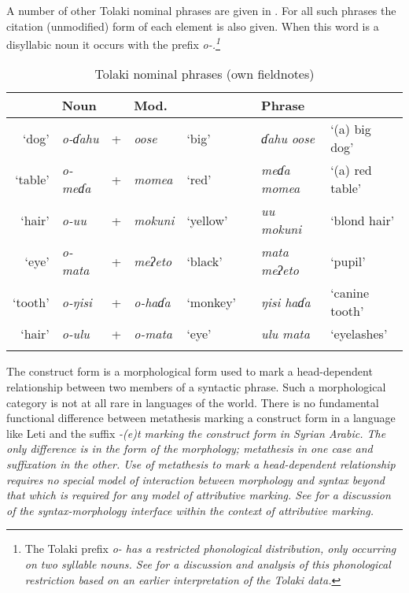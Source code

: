 \begin{exe}\let\eachwordone=\textit
\end{exe}

A number of other Tolaki nominal phrases are given in .
For all such phrases the citation (unmodified) form of each element is also given.
When this word is a disyllabic noun it occurs with the prefix \it{o-}.\footnote{
		The Tolaki prefix \it{o-} has a restricted phonological distribution,
		only occurring on two syllable nouns.
		See \cite{be12} for a discussion and analysis of this phonological restriction
		based on an earlier interpretation of the Tolaki data.}

\begin{table}[h]
	\caption[Tolaki nominal phrases]{Tolaki nominal phrases (own fieldnotes)}\label{tab:TolAttAdj}
	\centering
		\stl{0.4em}\begin{tabular}{rlcllcll}\lsptoprule
							&Noun						& &Mod.					&					&		&Phrase							&\\ \midrule
			`dog'		&\it{o-ɗahu}		&+&\it{o{\B}ose}&`big'		&\ra&\it{ɗahu o{\B}ose}	&`(a) big dog'\\
			`table'	&\it{o-meɗa}		&+&\it{momea}		&`red'		&\ra&\it{meɗa momea}		&`(a) red table'\\
			`hair'	&\it{o-{\B}uu}	&+&\it{mokuni}	&`yellow'	&\ra&\it{{\B}uu mokuni}	&`blond hair'\\
			`eye'		&\it{o-mata}		&+&\it{meʔeto}	&`black'	&\ra&\it{mata meʔeto}		&`pupil'\\
			`tooth'	&\it{o-ŋisi}		&+&\it{o-haɗa}	&`monkey'	&\ra&\it{ŋisi haɗa}			&`canine tooth'\\
			`hair'	&\it{o-{\B}ulu}	&+&\it{o-mata}	&`eye'		&\ra&\it{{\B}ulu mata}	&`eyelashes'\\ \lspbottomrule
		\end{tabular}
\end{table}

The construct form is a morphological form used to
mark a head-dependent relationship between
two members of a syntactic phrase.
Such a morphological category is not at all rare in languages of the world.
There is no fundamental functional difference between metathesis marking a
construct form in a language like Leti
and the suffix \it{-(e)t} marking the construct form in Syrian Arabic.
The only difference is in the form of the morphology;
metathesis in one case and suffixation in the other.
Use of metathesis to mark a head-dependent relationship requires
no special model of interaction between morphology and syntax
beyond that which is required for any model of attributive marking.
See \citet[15--22]{ri16} for a discussion of the syntax-morphology interface
within the context of attributive marking.


